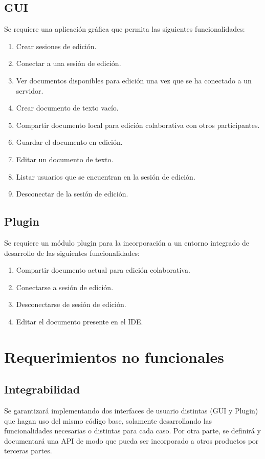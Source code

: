\documentclass[12pt,a4paper]{article}
\begin{document}
	\subsection{GUI} 
	Se requiere una aplicación gráfica que permita las siguientes funcionalidades:
	\begin{enumerate}
	\item Crear sesiones de edición.
	\item Conectar a una sesión de edición.
	\item Ver documentos disponibles para edición una vez que se ha conectado a un servidor.
	\item Crear documento de texto vacío.
	\item Compartir documento local para edición colaborativa con otros participantes.
	\item Guardar el documento en edición.
	\item Editar un documento de texto.
	\item Listar usuarios que se encuentran en la sesión de edición.
	\item Desconectar de la sesión de edición.
	\end{enumerate}


\subsection{Plugin}
Se requiere un módulo plugin para la incorporación a un entorno integrado de desarrollo de las siguientes funcionalidades:
	\begin{enumerate}
	\item Compartir documento actual para edición colaborativa.
	\item Conectarse a sesión de edición.
	\item Desconectarse de sesión de edición.
	\item Editar el documento presente en el IDE.
	\end{enumerate}
	\section{Requerimientos no funcionales}


\subsection{Integrabilidad} Se garantizará implementando dos interfaces de usuario distintas (GUI y Plugin) que hagan uso del mismo código base, solamente desarrollando las funcionalidades necesarias o distintas para cada caso.
Por otra parte, se definirá y documentará una API de modo que pueda ser incorporado a otros productos por terceras partes.
\end{document}
